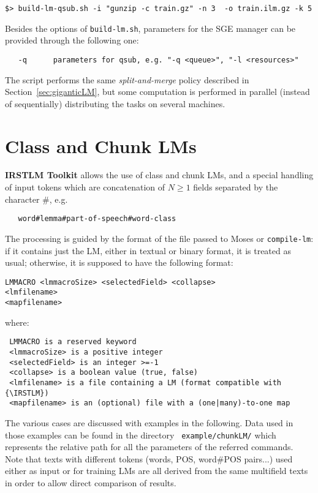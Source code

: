 \documentclass[11pt]{article}
\newcommand{\IRSTLM}{{\bf IRSTLM Toolkit}}
\begin{document}
\begin{verbatim}
$> build-lm-qsub.sh -i "gunzip -c train.gz" -n 3  -o train.ilm.gz -k 5
\end{verbatim}
Besides the options of {\tt build-lm.sh}, parameters for the SGE manager can be provided through the following one:

\begin{verbatim}
   -q      parameters for qsub, e.g. "-q <queue>", "-l <resources>"
\end{verbatim}

\noindent
The script performs the same {\em split-and-merge} policy described in Section~\ref{sec:giganticLM}, but some computation is performed in parallel (instead of sequentially) distributing the tasks on several machines.

\newpage
\section{Class and Chunk LMs}

{\IRSTLM} allows the use of class and chunk LMs, and a special
handling of input tokens which are concatenation of $N \ge 1$ fields separated
by the character \#, e.g.

\begin{verbatim}
   word#lemma#part-of-speech#word-class
\end{verbatim}

\noindent The processing is guided by the format of the file passed to
Moses or {\tt compile-lm}: if it contains just the LM, either in textual or
binary format, it is treated as usual; otherwise, it is supposed to have
the following format:

\begin{verbatim}
LMMACRO <lmmacroSize> <selectedField> <collapse>
<lmfilename>
<mapfilename>
\end{verbatim}

\noindent where:
\begin{verbatim}
 LMMACRO is a reserved keyword
 <lmmacroSize> is a positive integer
 <selectedField> is an integer >=-1
 <collapse> is a boolean value (true, false)
 <lmfilename> is a file containing a LM (format compatible with {\IRSTLM})
 <mapfilename> is an (optional) file with a (one|many)-to-one map
\end{verbatim}

\noindent The various cases are discussed with examples in the
following. Data used in those examples can be found in the directory {\tt
example/chunkLM/} which represents the relative path for all the parameters
of the referred commands.  Note that texts with different tokens (words,
POS, word\#POS pairs...) used either as input or for training LMs are all
derived from the same multifield texts in order to allow direct comparison
of results.
\end{document}
